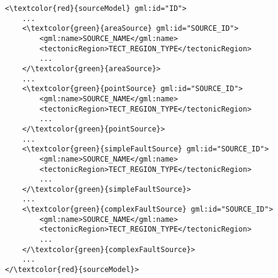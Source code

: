 \begin{Verbatim}[frame=single, commandchars=\\\{\}, fontsize=\small]
<\textcolor{red}{sourceModel} gml:id="ID">
	...
	<\textcolor{green}{areaSource} gml:id="SOURCE_ID">
		<gml:name>SOURCE_NAME</gml:name>
		<tectonicRegion>TECT_REGION_TYPE</tectonicRegion>
		...
	</\textcolor{green}{areaSource}>
	...
	<\textcolor{green}{pointSource} gml:id="SOURCE_ID">
		<gml:name>SOURCE_NAME</gml:name>
		<tectonicRegion>TECT_REGION_TYPE</tectonicRegion>
		...
	</\textcolor{green}{pointSource}>
	...
	<\textcolor{green}{simpleFaultSource} gml:id="SOURCE_ID">
		<gml:name>SOURCE_NAME</gml:name>
		<tectonicRegion>TECT_REGION_TYPE</tectonicRegion>
		...
	</\textcolor{green}{simpleFaultSource}>
	...
	<\textcolor{green}{complexFaultSource} gml:id="SOURCE_ID">
		<gml:name>SOURCE_NAME</gml:name>
		<tectonicRegion>TECT_REGION_TYPE</tectonicRegion>
		...
	</\textcolor{green}{complexFaultSource}>
	...
</\textcolor{red}{sourceModel}>
\end{Verbatim}